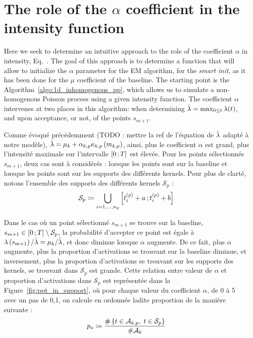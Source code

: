 \section{The role of the \texorpdfstring{$\alpha$}{TEXT} coefficient in the intensity function}\label{app:role_alpha_coef}

Here we seek to determine an intuitive approach to the role of the coefficient $\alpha$ in intensity, Eq.~.
The goal of this approach is to determine a function that will allow to initialize the $\alpha$ parameter for the EM algorithm, for the \textit{smart init}, as it has been done for the $\mu$ coefficient of the baseline.
The starting point is the Algorithm~\ref{algo:1d_inhomogenous_pp}, which allows us to simulate a non-homogenous Poisson process using a given intensity function.
The coefficient $\alpha$ intervenes at two places in this algorithm: when determining $\Bar{\lambda} = \max_{0 \leq t} \lambda(t)$, and upon acceptance, or not, of the points $s_{m+1}$.

Comme évoqué précédemment (TODO : mettre la ref de l'équation de $\Bar{\lambda}$ adapté à notre modèle), $\Bar{\lambda} = \mu_k + \alpha_{k,p}\kappa_{k,p}\left( m_{k,p} \right)$, ainsi, plus le coefficient $\alpha$ est grand, plus l'intensité maximale sur l'intervalle $\left[ 0 \, ; T \right]$ est élevée.
Pour les points sélectionnés $s_{m+1}$, deux cas sont à considérés : lorsque les points sont sur la baseline et lorsque les points sont sur les supports des différents kernels.
Pour plus de clarté, notons l'ensemble des supports des différents kernels $\mathcal{S}_{p}$ :
\begin{equation}
    \mathcal{S}_{p} \coloneqq \bigcup_{i = 1,\dots,n_p} \left[ t^{(p)}_i + a \, ; t^{(p)}_i + b \right]
\end{equation}

Dans le cas où un point sélectionné $s_{m+1}$ se trouve sur la baseline, \cad $s_{m+1} \in \left[ 0 \, ; T \right] \setminus \mathcal{S}_{p}$, la probabilité d'accepter ce point est égale à $\lambda\left( s_{m+1} \right) / \Bar{\lambda} = \mu_k / \Bar{\lambda}$, et donc diminue lorsque $\alpha$ augmente.
De ce fait, plus $\alpha$ augmente, plus la proportion d'activations se trouvant sur la baseline diminue, et inversement, plus la proportion d'activations se trouvant sur les supports des kernels, \cad se trouvant dans $\mathcal{S}_{p}$ est grande.
Cette relation entre valeur de $\alpha$ et proportion d'activations dans $\mathcal{S}_{p}$ est représentée dans la Figure~\ref{fig:ppt_in_support}, où pour chaque valeur du coefficient $\alpha$, de 0 à 5 avec un pas de 0,1, on calcule en ordonnée ladite proportion de la manière suivante :
\begin{equation}
    p_a \coloneqq \frac{\#\left\lbrace t\in\mathcal{A}_{k,p},\; t\in\mathcal{S}_{p} \right\rbrace}{\# \mathcal{A}_k}
\end{equation}

